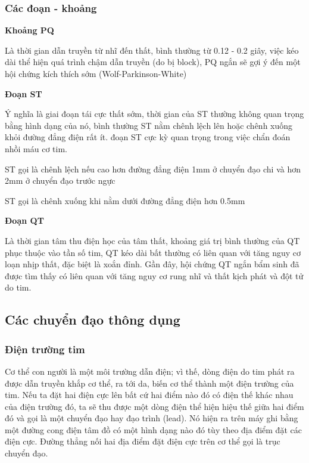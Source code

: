 \subsubsection{Các đoạn - khoảng}
\textbf{Khoảng PQ}\par
Là thời gian dẫn truyền từ nhĩ đến thất, bình thường từ 0.12 - 0.2 giây, việc kéo dài thể hiện quá trình chậm dẫn truyền (do bị block), PQ ngắn sẽ gợi ý đến một hội chứng kích thích sớm (Wolf-Parkinson-White)\par
\textbf{Đoạn ST}\par
Ý nghĩa là giai đoạn tái cực thất sớm, thời gian của ST thường không quan trọng bằng hình dạng của nó, bình thường ST nằm chênh lệch lên hoặc chênh xuống khỏi đường đẳng điện rất ít. đoạn ST cực kỳ quan trọng trong việc chẩn đoán nhồi máu cơ tim.\par
ST gọi là chênh lệch nếu cao hơn đường đẳng điện 1mm ở chuyển đạo chi và hơn 2mm ở chuyển đạo trước ngực\par
ST gọi là chênh xuống khi nằm dưới đường đẳng điện hơn 0.5mm\par
\textbf{Đoạn QT}\par
Là thời gian tâm thu điện học của tâm thất, khoảng giá trị bình thường của QT phục thuộc vào tần số tim, QT kéo dài bất thường có liên quan với tăng nguy cơ loạn nhịp thất, đặc biệt là xoắn đỉnh. Gần đây, hội chứng QT ngắn bẩm sinh đã được tìm thấy có liên quan với tăng nguy cơ rung nhĩ và thất kịch phát và đột tử do tim.

\subsection{Các chuyển đạo thông dụng}

\subsubsection{Điện trường tim}
Cơ thể con người là một môi trường dẫn điện; vì thế, dòng điện do tim phát ra được dẫn truyền khắp cơ thể, ra tới da, biến cơ thể thành một điện trường của tim. Nếu ta đặt hai điện cực lên bất cứ hai điểm nào đó có điện thế khác nhau của điện trường đó, ta sẽ thu được một dòng điện thể hiện hiệu thế giữa hai điểm đó và gọi là một chuyển đạo hay đạo trình (lead). Nó hiện ra trên máy ghi bằng một đường cong điện tâm đồ có một hình dạng nào đó tùy theo địa điểm đặt các điện cực. Đường thẳng nối hai địa điểm đặt điện cực trên cơ thể gọi là trục chuyển đạo.

